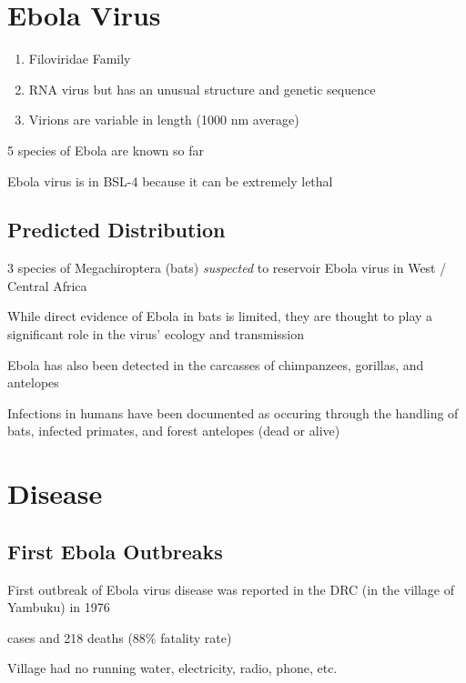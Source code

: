 \documentclass{notes}
\begin{document}
\section{Ebola Virus}

\begin{enumerate}
    \item Filoviridae Family
    \item RNA virus but has an unusual structure and genetic sequence
    \item Virions are variable in length (1000 nm average)
\end{enumerate}

5 species of Ebola are known so far


Ebola virus is in BSL-4 because it can be extremely lethal


\subsection{Predicted Distribution}

3 species of Megachiroptera (bats) \textit{suspected} to reservoir Ebola virus in West / Central Africa

While direct evidence of Ebola in bats is limited, they are thought to play a significant role in the virus' ecology and transmission

Ebola has also been detected in the carcasses of chimpanzees, gorillas, and antelopes

\tab Infections in humans have been documented as occuring through the handling of bats, infected primates, and forest antelopes (dead or alive)

\section{Disease}

\subsection{First Ebola Outbreaks}

First outbreak of Ebola virus disease was reported in the DRC (in the village of Yambuku) in 1976

 cases and 218 deaths (88\% fatality rate)

\tab Village had no running water, electricity, radio, phone, etc.
\end{document}
